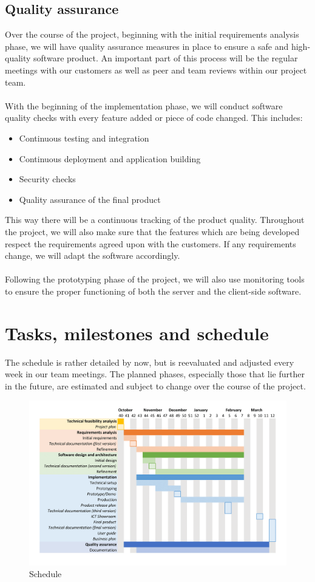 \subsection{Quality assurance}\label{sec:quality}

Over the course of the project, beginning with the initial requirements analysis phase, we will have quality assurance measures in place to ensure a safe and high-quality software product. An important part of this process will be the regular meetings with our customers as well as peer and team reviews within our project team.
\\\\
With the beginning of the implementation phase, we will conduct software quality checks with every feature added or piece of code changed. This includes:

\begin{itemize}
	\item Continuous testing and integration
	\item Continuous deployment and application building
	\item Security checks
	\item Quality assurance of the final product
\end{itemize}

\noindent
This way there will be a continuous tracking of the product quality. Throughout the project, we will also make sure that the features which are being developed respect the requirements agreed upon with the customers. If any requirements change, we will adapt the software accordingly.
\\\\
Following the prototyping phase of the project, we will also use monitoring tools to ensure the proper functioning of both the server and the client-side software.

\section{Tasks, milestones and schedule}\label{sec:schedule}

The schedule is rather detailed by now, but is reevaluated and adjusted every week in our team meetings. The planned phases, especially those that lie further in the future, are estimated and subject to change over the course of the project.

\begin{figure}[ht]
	\centering
	\includegraphics[width=\linewidth]{img/schedule}
	\caption{Schedule}
	\label{fig:schedule}
\end{figure}
